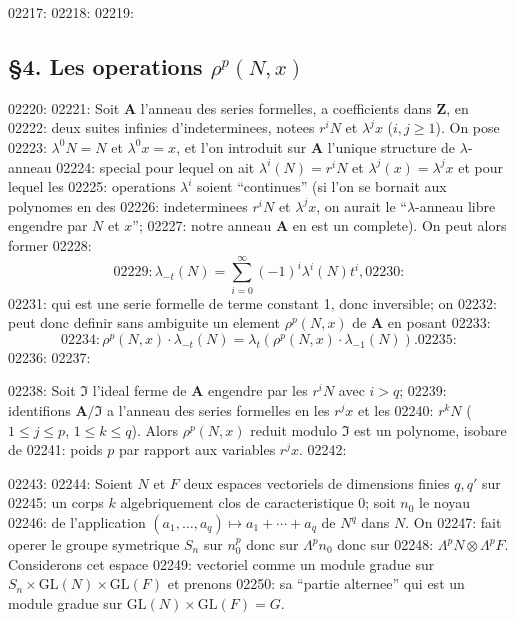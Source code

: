02217: 
02218: 
02219: \subsection*{\S 4. Les operations $\rho^p(N, x)$}
02220: 
02221: Soit $\mathbf{A}$ l'anneau des series formelles, a coefficients dans $\mathbf{Z}$, en
02222: deux suites infinies d'indeterminees, notees $r^i N$ et $\lambda^j x$ ($i, j \geq 1$). On pose
02223: $\lambda^0 N = N$ et $\lambda^0 x = x$, et l'on introduit sur $\mathbf{A}$ l'unique structure de $\lambda$-anneau
02224: special pour lequel on ait $\lambda^i(N) = r^i N$ et $\lambda^j(x) = \lambda^j x$ et pour lequel les
02225: operations $\lambda^i$ soient ``continues'' (si l'on se bornait aux polynomes en des
02226: indeterminees $r^i N$ et $\lambda^j x$, on aurait le ``$\lambda$-anneau libre engendre par $N$ et $x$'';
02227: notre anneau $\mathbf{A}$ en est un complete). On peut alors former
02228: \begin{equation}
02229: \lambda_{-t}(N) = \sum_{i=0}^{\infty} (-1)^i \lambda^i(N) t^i,
02230: \end{equation}
02231: qui est une serie formelle de terme constant 1, donc inversible; on
02232: peut donc definir sans ambiguite un element $\rho^p(N, x)$ de $\mathbf{A}$ en posant
02233: \begin{equation}
02234: \rho^p(N, x) \cdot \lambda_{-t}(N) = \lambda_t(\rho^p(N, x) \cdot \lambda_{-1}(N)).
02235: \end{equation}
02236: 
02237: \begin{theorem}
02238: Soit $\mathfrak{I}$ l'ideal ferme de $\mathbf{A}$ engendre par les $r^i N$ avec $i > q$;
02239: identifions $\mathbf{A}/\mathfrak{I}$ a l'anneau des series formelles en les $r^j x$ et les
02240: $r^k N$ ($1 \leq j \leq p$, $1 \leq k \leq q$). Alors $\rho^p(N, x)$ reduit modulo $\mathfrak{I}$ est un polynome, isobare de
02241: poids $p$ par rapport aux variables $r^j x$.
02242: \end{theorem}
02243: 
02244: Soient $N$ et $F$ deux espaces vectoriels de dimensions finies $q, q'$ sur
02245: un corps $k$ algebriquement clos de caracteristique 0; soit $n_0$ le noyau
02246: de l'application $(a_1, \ldots, a_q) \mapsto a_1 + \cdots + a_q$ de $N^q$ dans $N$. On
02247: fait operer le groupe symetrique $S_n$ sur $n_0^p$ donc sur $\Lambda^p n_0$ donc sur
02248: $\Lambda^p N \otimes \Lambda^p F$. Considerons cet espace
02249: vectoriel comme un module gradue sur $S_n \times \mathrm{GL}(N) \times \mathrm{GL}(F)$ et prenons
02250: sa ``partie alternee'' qui est un module gradue sur $\mathrm{GL}(N) \times \mathrm{GL}(F) = G$.
